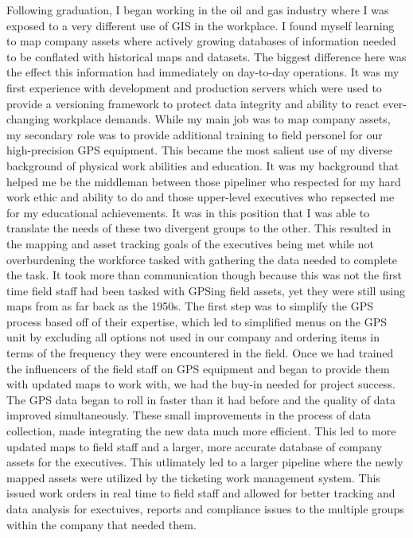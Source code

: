 \documentclass[12pt, letterpaper]{awesome-cv} %
\begin{document}
\begin{cvletter}
Following graduation, I began working in the oil and gas industry where I was exposed to a very different use of GIS in the workplace. I found myself learning to map company assets where actively growing databases of information needed to be conflated with historical maps and datasets. The biggest difference here was the effect this information had immediately on day-to-day operations. It was my first experience with development and production servers which were used to provide a versioning framework to protect data integrity and ability to react ever-changing workplace demands. While my main job was to map company assets, my secondary role was to provide additional training to field personel for our high-precision GPS equipment. This became the most salient use of my diverse background of physical work abilities and education. It was my background that helped me be the middleman between those pipeliner who respected for my hard work ethic and ability to do and those upper-level executives who repsected me for my educational achievements. It was in this position that I was able to translate the needs of these two divergent groups to the other. This resulted in the mapping and asset tracking goals of the executives being met while not overburdening the workforce tasked with gathering the data needed to complete the task. It took more than communication though because this was not the first time field staff had been tasked with GPSing field assets, yet they were still using maps from as far back as the 1950s. The first step was to simplify the GPS process based off of their expertise, which led to simplified menus on the GPS unit by excluding all options not used in our company and ordering items in terms of the frequency they were encountered in the field. Once we had trained the influencers of the field staff on GPS equipment and began to provide them with updated maps to work with, we had the buy-in needed for project success. The GPS data began to roll in faster than it had before and the quality of data improved simultaneously. These small improvements in the process of data collection, made integrating the new data much more efficient. This led to more updated maps to field staff and a larger, more accurate database of company assets for the executives. This utlimately led to a larger pipeline where the newly mapped assets were utilized by the ticketing work management system. This issued work orders in real time to field staff and allowed for better tracking and data analysis for exectuives, reports and compliance issues to the multiple groups within the company that needed them.


\end{cvletter}
\end{document}
